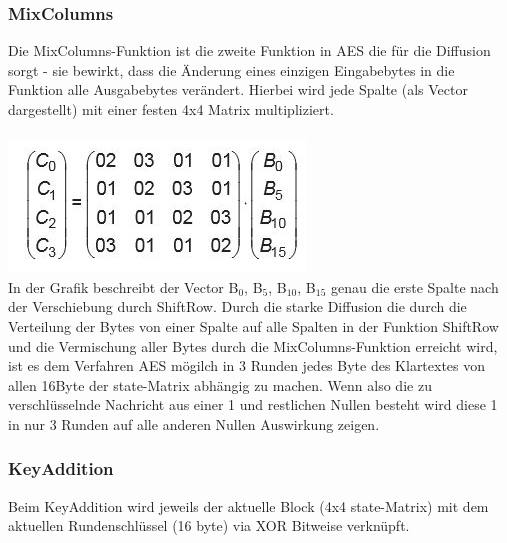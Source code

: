 \documentclass[10pt, a4paper]{scrreprt}
\begin{document}
\subsubsection{MixColumns}
Die MixColumns-Funktion ist die zweite Funktion in AES die für die Diffusion sorgt - sie bewirkt, dass die Änderung eines einzigen Eingabebytes in die Funktion alle Ausgabebytes verändert. Hierbei wird jede Spalte (als Vector dargestellt) mit einer festen 4x4 Matrix multipliziert. \\ \\
\includegraphics[scale=0.5]{aes_mixcol.JPG} \\
In der Grafik beschreibt der Vector B$_{0}$, B$_{5}$, B$_{10}$, B$_{15}$ genau die erste Spalte nach der Verschiebung durch ShiftRow. 
Durch die starke Diffusion die durch die Verteilung der Bytes von einer Spalte auf alle Spalten in der Funktion ShiftRow und die Vermischung aller Bytes durch die MixColumns-Funktion erreicht wird, ist es dem Verfahren AES mögilch in 3 Runden jedes Byte des Klartextes von allen 16Byte der state-Matrix abhängig zu machen. Wenn also die zu verschlüsselnde Nachricht aus einer 1 und restlichen Nullen besteht wird diese 1 in nur 3 Runden auf alle anderen Nullen Auswirkung zeigen.


\subsubsection{KeyAddition}
Beim KeyAddition wird jeweils der aktuelle Block (4x4 state-Matrix) mit dem aktuellen Rundenschlüssel (16 byte) via XOR Bitweise verknüpft. 
\end{document}
